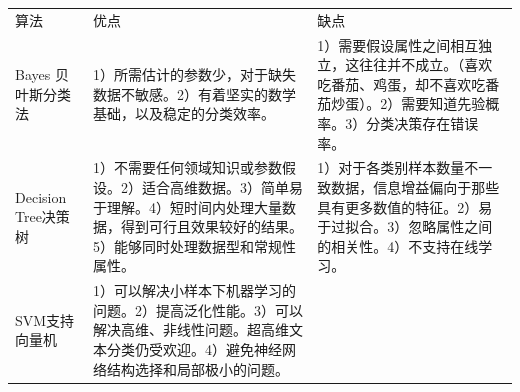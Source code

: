 \begin{longtable}[]{lll}
\begin{minipage}[b]{0.04\columnwidth}\raggedright\strut
算法\strut
\end{minipage} & \begin{minipage}[b]{0.04\columnwidth}\raggedright\strut
优点\strut
\end{minipage} & \begin{minipage}[b]{0.04\columnwidth}\raggedright\strut
缺点\strut
\end{minipage}\tabularnewline
\begin{minipage}[t]{0.04\columnwidth}\raggedright\strut
Bayes 贝叶斯分类法\strut
\end{minipage} & \begin{minipage}[t]{0.04\columnwidth}\raggedright\strut
1）所需估计的参数少，对于缺失数据不敏感。2）有着坚实的数学基础，以及稳定的分类效率。\strut
\end{minipage} & \begin{minipage}[t]{0.04\columnwidth}\raggedright\strut
1）需要假设属性之间相互独立，这往往并不成立。（喜欢吃番茄、鸡蛋，却不喜欢吃番茄炒蛋）。2）需要知道先验概率。3）分类决策存在错误率。\strut
\end{minipage}\tabularnewline
\begin{minipage}[t]{0.04\columnwidth}\raggedright\strut
Decision Tree决策树\strut
\end{minipage} & \begin{minipage}[t]{0.04\columnwidth}\raggedright\strut
1）不需要任何领域知识或参数假设。2）适合高维数据。3）简单易于理解。4）短时间内处理大量数据，得到可行且效果较好的结果。5）能够同时处理数据型和常规性属性。\strut
\end{minipage} & \begin{minipage}[t]{0.04\columnwidth}\raggedright\strut
1）对于各类别样本数量不一致数据，信息增益偏向于那些具有更多数值的特征。2）易于过拟合。3）忽略属性之间的相关性。4）不支持在线学习。\strut
\end{minipage}\tabularnewline
\begin{minipage}[t]{0.04\columnwidth}\raggedright\strut
SVM支持向量机\strut
\end{minipage} & \begin{minipage}[t]{0.04\columnwidth}\raggedright\strut
1）可以解决小样本下机器学习的问题。2）提高泛化性能。3）可以解决高维、非线性问题。超高维文本分类仍受欢迎。4）避免神经网络结构选择和局部极小的问题。\strut
\end{minipage} & \begin{minipage}[t]{0.04\columnwidth}\raggedright\strut

\end{minipage}
\end{longtable}
